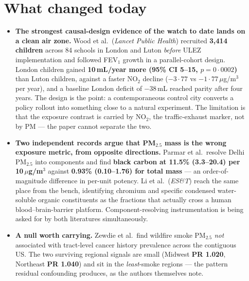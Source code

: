 \documentclass[10pt]{article}
\begin{document}
\vspace{3mm}

\section*{\sffamily\bfseries\color{Deep}What changed today}
\vspace{-1.5mm}{\color{Amber}\rule{\linewidth}{1.1pt}}\vspace{2.5mm}

\footnotesize
\begin{itemize}
\item \textbf{The strongest causal-design evidence of the watch to date lands on a clean
air zone.} Wood et al.\ (\textit{Lancet Public Health}) recruited \textbf{3,414 children}
across 84 schools in London and Luton \emph{before} ULEZ implementation and followed
FEV$_1$ growth in a parallel-cohort design. London children gained
\textbf{10\,mL/year more (95\% CI 5--15, $p=0{\cdot}0002$)} than Luton children, against a
faster NO$_2$ decline ($-3{\cdot}77$ vs $-1{\cdot}77\,\mu$g/m$^3$ per year), and a baseline
London deficit of $-38$\,mL reached parity after four years. The design is the point:
a contemporaneous control city converts a policy rollout into something close to a natural
experiment. The limitation is that the exposure contrast is carried by NO$_2$, the
traffic-exhaust marker, not by PM --- the paper cannot separate the two.

\item \textbf{Two independent records argue that PM$_{2.5}$ mass is the wrong exposure
metric, from opposite directions.} Parmar et al.\ resolve Delhi PM$_{2.5}$ into components
and find \textbf{black carbon at 11.5\% (3.3--20.4) per 10\,$\mu$g/m$^3$} against
\textbf{0.93\% (0.10--1.76) for total mass} --- an order-of-magnitude difference in
per-unit potency. Li et al.\ (\textit{ES\&T}) reach the same place from the bench,
identifying chromium and specific condensed water-soluble organic constituents as the
fractions that actually cross a human blood--brain-barrier platform. Component-resolving
instrumentation is being asked for by both literatures simultaneously.

\item \textbf{A null worth carrying.} Zewdie et al.\ find wildfire smoke PM$_{2.5}$
\emph{not} associated with tract-level cancer history prevalence across the contiguous US.
The two surviving regional signals are small (Midwest \textbf{PR 1.020}, Northeast
\textbf{PR 1.040}) and sit in the \emph{least}-smoke regions --- the pattern residual
confounding produces, as the authors themselves note.


\end{itemize}
\end{document}
